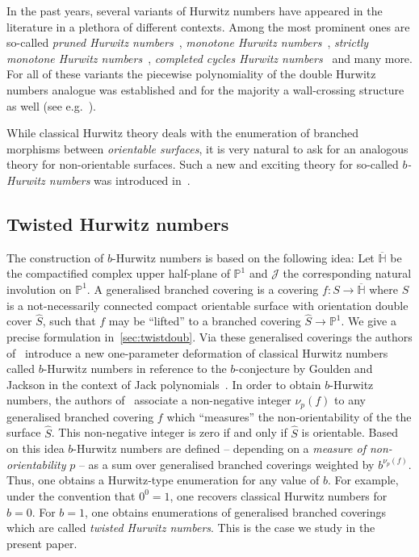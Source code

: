 \documentclass[11pt]{article}
\theoremstyle{definition}
\numberwithin{equation}{section}
\begin{document}
In the past years, several variants of Hurwitz numbers have appeared in the literature in a plethora of different contexts. Among the most prominent ones are so-called \textit{pruned Hurwitz numbers}~\cite{do2018pruned,hahn2020bi}, \textit{monotone Hurwitz numbers}~\cite{goulden2014monotone}, \textit{strictly monotone Hurwitz numbers}~\cite{kazarian2015virasoro}, \textit{completed cycles Hurwitz numbers}~\cite{okounkov2006gromov} and many more. For all of these variants the piecewise polynomiality of the double Hurwitz numbers analogue was established and for the majority a wall-crossing structure as well (see e.g.~\cite{zbMATH06791415, hahn2018wall,hahn2020wall,shadrin2012double}).

While classical Hurwitz theory deals with the enumeration of branched morphisms between \textit{orientable surfaces}, it is very natural to ask for an analogous theory for non-orientable surfaces. Such a new and exciting theory for so-called \textit{$b$-Hurwitz numbers} was introduced in~\cite{chapuy2020non}.

\subsection{Twisted Hurwitz numbers}\label{sec-twistedsingle}
The construction of $b$-Hurwitz numbers is based on the following idea:  Let $\overline{\mathbb{H}}$ be the compactified complex upper half-plane of $\mathbb{P}^1$ and $\mathcal{J}$ the corresponding natural involution on $\mathbb{P}^1$. A generalised branched covering is a covering $f\colon S\to\overline{\mathbb{H}}$ where $S$ is a not-necessarily connected compact orientable surface with orientation double cover $\hat{S}$, such that $f$ may be ``lifted'' to a branched covering $\hat{S}\to\mathbb{P}^1$. We give a precise formulation in~\cref{sec:twistdoub}. Via these generalised coverings the authors of~\cite{chapuy2020non} introduce a new one-parameter deformation of classical Hurwitz numbers called $b$-Hurwitz numbers in reference to the $b$-conjecture by Goulden and Jackson in the context of Jack polynomials~\cite{goulden1996connection}. In order to obtain $b$-Hurwitz numbers, the authors of~\cite{chapuy2020non} associate a non-negative integer $\nu_p(f)$ to any generalised branched covering $f$ which ``measures'' the non-orientability of the the surface $\hat{S}$. This non-negative integer is zero if and only if $\hat{S}$ is orientable. Based on this idea $b$-Hurwitz numbers are defined -- depending on a \textit{measure of non-orientability} $p$ -- as a sum over generalised branched coverings weighted by $b^{\nu_p(f)}$. Thus, one obtains a Hurwitz-type enumeration for any value of $b$. For example, under the convention that $0^0=1$, one  recovers classical Hurwitz numbers for $b=0$. For $b=1$, one obtains enumerations of generalised branched coverings which are called \textit{twisted Hurwitz numbers}. This is the case we study in the present paper.
\end{document}
